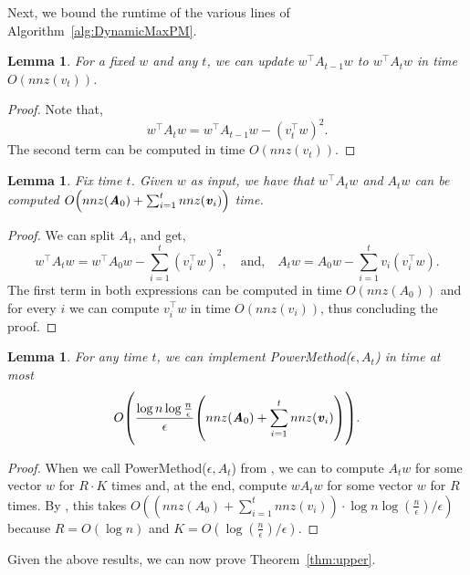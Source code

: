 \documentclass[11pt]{article}
\newtheorem{lemma}[theorem]{Lemma}
\let\originalleft\left
\let\originalright\right
\renewcommand{\left}{\mathopen{}\mathclose\bgroup\originalleft}
\renewcommand{\right}{\aftergroup\egroup\originalright}
\newcommand\vv{\boldsymbol{\mathit{v}}}
\newcommand\ww{\boldsymbol{\mathit{w}}}
\renewcommand\AA{\boldsymbol{\mathit{A}}}
\begin{document}
Next, we bound the runtime of the various lines of Algorithm~\ref{alg:DynamicMaxPM}. 
\begin{lemma}\label{lem:SameW}
For a fixed $\ww$ and any $t$, we can update $\ww^{\top}\AA_{t-1}\ww$ to $\ww^{\top}\AA_t\ww$ in time $O(nnz(\vv_t))$.
\end{lemma}
\begin{proof}
Note that,
\[
\ww^{\top}\AA_t\ww = \ww^{\top}\AA_{t-1}\ww - (\vv_t^{\top}\ww)^2.
\]
The second term can be computed in time $O(nnz(\vv_t))$.
\end{proof}
\begin{lemma}\label{lem:DiffW}
Fix time $t$. Given $\ww$ as input, we have that $\ww^{\top}\AA_t\ww$ and $\AA_t\ww$ can be computed $O\left(nnz(\AA_0) +\sum_{i=1}^t nnz(\vv_i)\right)$ time.
\end{lemma}
\begin{proof}
We can split $\AA_t$, and get,
\[
\ww^{\top}\AA_t\ww = \ww^{\top}\AA_0\ww - \sum_{i=1}^t (\vv_i^{\top}\ww)^2,\quad \text{and,}\quad
\AA_t\ww = \AA_0\ww - \sum_{i=1}^t \vv_i(\vv_i^{\top}\ww).
\]
The first term in both expressions can be computed in time $O(nnz(\AA_0))$ and for every $i$ we can compute $\vv_i^{\top}\ww$ in time $O(nnz(\vv_i))$, thus concluding the proof.
\end{proof}
\begin{lemma}\label{lem:PMt}For any time $t$, we can implement {\sc PowerMethod}($\epsilon,\AA_t$) in time at most 
\[
O\left(\frac{\log n\log \frac{n}{\epsilon}}{\epsilon}\left(nnz(\AA_0) +\sum_{i=1}^t nnz(\vv_i)\right)\right).
\]
\end{lemma}
\begin{proof}
When we call {\sc PowerMethod}($\epsilon,\AA_t$) from , we can to compute $\AA_t\ww$ for some vector $\ww$ for $R\cdot K$ times and, at the end, compute $\ww \AA_t\ww$ for some vector $\ww$ for $R$ times. 
By , this takes $O( (nnz(\AA_0) +\sum_{i=1}^t nnz(\vv_i) ) \cdot \log n\log (\frac{n}{\epsilon})/\epsilon)$ because $R = O(\log n)$ and $K = O(\log(\frac{n}{\epsilon})/\epsilon)$.


\end{proof}

 Given the above results, we can now prove Theorem~\ref{thm:upper}.
\end{document}
